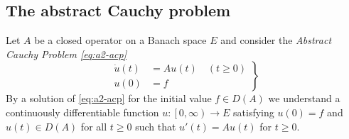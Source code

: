 \subsection{The abstract Cauchy problem} \label{subsec:a2-1.se1}
Let $A$ be a closed operator on a Banach space $E$ and consider the \emph{Abstract Cauchy Problem \eqref{eq:a2-acp}}
\begin{equation*}\label{eq:a2-acp} \tag{ACP}
\left.
\begin{aligned}
    \dot{u}(t) &= Au(t) \quad (t \geq 0) \\
    u(0) &= f
\end{aligned} 
\right\}   
\end{equation*}
By a solution of \eqref{eq:a2-acp} for the initial value $f \in D(A)$ we understand a continuously differentiable function $u \colon \left[0,\infty\right) \to E$ satisfying $u(0) = f$ and $u(t) \in D(A)$ for all $t \geq 0$ such that $u'(t) = Au(t)$ for $t \geq 0$.

